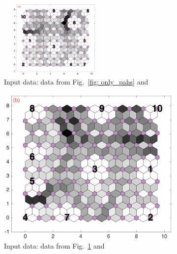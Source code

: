 \begin{figure}
    \begin{subfigure}[b]{0.25\textwidth}
        \centering
        \includegraphics[width=54mm, height=38mm]{../../images0.01/M31/2D/diff_dimension/combine_2D_data_between_cols3and11.png}
        \caption{Input data: data from Fig.~\ref{fig: only_pahs} and \halpha}
        \label{fig: col3and11_dist}
    \end{subfigure}
    \hfill
    \begin{subfigure}[b]{0.25\textwidth}
        \centering
        \includegraphics[width=\textwidth]{../../images0.01/M31/2D/diff_dimension/combine_2D_data_between_cols3and12.png}
        \caption{Input data: data from Fig.~\ref{fig: col3and11_dist} and \oiii}
        \label{fig: col3and12_dist}
    \end{subfigure}
        \hfill
    \begin{subfigure}[b]{0.25\textwidth}
        \centering

\end{subfigure}
\end{figure}

